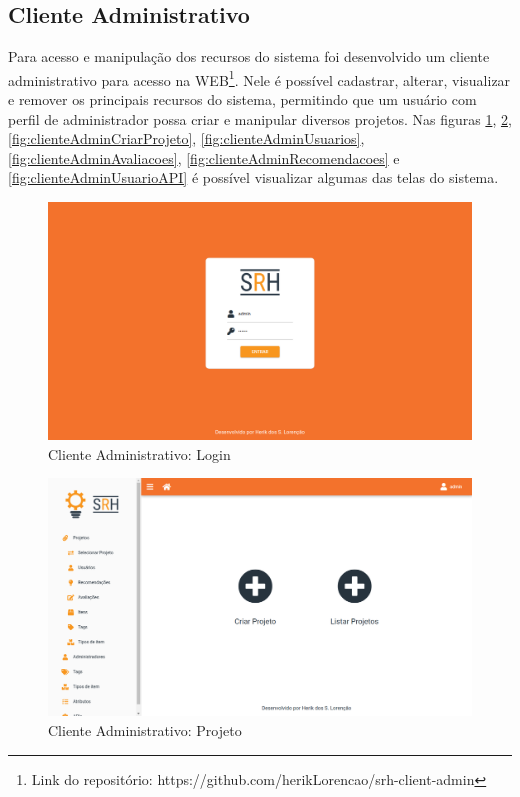 \subsection{Cliente Administrativo}

Para acesso e manipulação dos recursos do sistema foi desenvolvido um cliente administrativo para acesso na WEB\footnote{Link do repositório: https://github.com/herikLorencao/srh-client-admin}. Nele é possível cadastrar, alterar, visualizar e remover os principais recursos do sistema, permitindo que um usuário com perfil de administrador possa criar e manipular diversos projetos. Nas figuras \ref{fig:clienteAdminLogin}, \ref{fig:clienteAdminProjeto}, \ref{fig:clienteAdminCriarProjeto}, \ref{fig:clienteAdminUsuarios}, \ref{fig:clienteAdminAvaliacoes}, \ref{fig:clienteAdminRecomendacoes} e \ref{fig:clienteAdminUsuarioAPI} é possível visualizar algumas das telas do sistema.

\begin{figure}[H]
	\centering
	\includegraphics[width=.9\linewidth]{imagens/adminLogin.png}
	\caption[Cliente Administrativo: Login]{Cliente Administrativo: Login}
    \label{fig:clienteAdminLogin}
\end{figure}

\begin{figure}[H]
	\centering
	\includegraphics[width=.9\linewidth]{imagens/adminCriarProjeto.png}
	\caption[Cliente Administrativo: Projeto]{Cliente Administrativo: Projeto}
    \label{fig:clienteAdminProjeto}
\end{figure}

